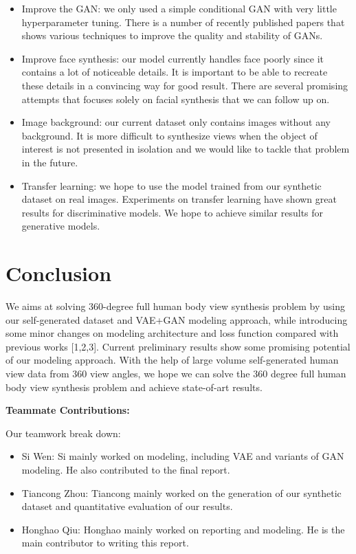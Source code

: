 \documentclass[10pt,conference]{IEEEtran}
\begin{document}
\begin{itemize}
\item Improve the GAN: we only used a simple conditional GAN with very little hyperparameter tuning. There is a number of recently published papers that shows various techniques to improve the quality and stability of GANs.

\item Improve face synthesis: our model currently handles face poorly since it contains a lot of noticeable details. It is important to be able to recreate these details in a convincing way for good result. There are several promising attempts \autocite{yim2015rotating, huang2017beyond} that focuses solely on facial synthesis that we can follow up on.

\item Image background: our current dataset only contains images without any background. It is more difficult to synthesize views when the object of interest is not presented in isolation and we would like to tackle that problem in the future.

\item Transfer learning: we hope to use the model trained from our synthetic dataset on real images. Experiments on transfer learning \autocite{shrivastava2016learning} have shown great results for discriminative models. We hope to achieve similar results for generative models.
\end{itemize}

\section{Conclusion}
We aims at solving 360-degree full human body view synthesis problem by using our self-generated dataset and VAE+GAN modeling approach, while introducing some minor changes on modeling architecture and loss function compared with previous works [1,2,3].
Current preliminary results show some promising potential of our modeling approach. With the help of large volume self-generated human view data from 360 view angles, we hope we can solve the 360 degree full human body view synthesis problem and achieve state-of-art results.

\textbf{Teammate Contributions:}

Our teamwork break down:
\begin{itemize}
\item Si Wen: Si mainly worked on modeling, including VAE and variants of GAN modeling. He also contributed to the final report.
\item Tiancong Zhou: Tiancong mainly worked on the generation of our synthetic dataset and quantitative evaluation of our results.
\item Honghao Qiu: Honghao mainly worked on reporting and modeling. He is the main contributor to writing this report.
\end{itemize}

\printbibliography
\end{document}
